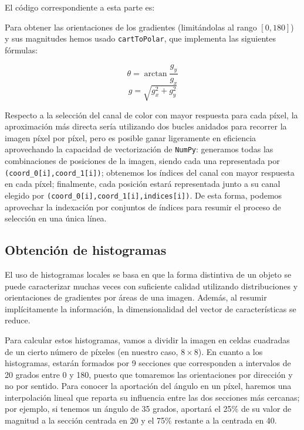 \documentclass[11pt,a4paper]{article}
\begin{document}
            \par
            El código correspondiente a esta parte es:


            \par
            Para obtener las orientaciones de los gradientes (limitándolas al rango $[0,180]$) y sus magnitudes hemos usado \texttt{cartToPolar}, que implementa las siguientes fórmulas:

            $$\theta = \arctan{\frac{g_y}{g_x}}$$
            $$g = \sqrt{g_{x}^2 + g_{y}^2}$$

            \par
            Respecto a la selección del canal de color con mayor respuesta para cada píxel, la aproximación más directa sería utilizando dos bucles anidados para recorrer la imagen píxel por píxel, pero es posible ganar ligeramente en eficiencia aprovechando la capacidad de vectorización de \texttt{NumPy}: generamos todas las combinaciones de posiciones de la imagen, siendo cada una representada por \texttt{(coord\_0[i],coord\_1[i])}; obtenemos los índices del canal con mayor respuesta en cada píxel; finalmente, cada posición estará representada junto a su canal elegido por \texttt{(coord\_0[i],coord\_1[i],indices[i])}. De esta forma, podemos aprovechar la indexación por conjuntos de índices para resumir el proceso de selección en una única línea.

        \subsection{Obtención de histogramas}

            \par
            El uso de histogramas locales se basa en que la forma distintiva de un objeto se puede caracterizar muchas veces con suficiente calidad utilizando distribuciones y orientaciones de gradientes por áreas de una imagen. Además, al resumir implícitamente la información, la dimensionalidad del vector de características se reduce.

            \par
            Para calcular estos histogramas, vamos a dividir la imagen en celdas cuadradas de un cierto número de píxeles (en nuestro caso, $8\times8$). En cuanto a los  histogramas, estarán formados por 9 secciones que corresponden a intervalos de 20 grados entre 0 y 180, puesto que tomaremos las orientaciones por dirección y no por sentido. Para conocer la aportación del ángulo en un píxel, haremos una interpolación lineal que reparta su influencia entre las dos secciones más cercanas; por ejemplo, si tenemos un ángulo de 35 grados, aportará el 25\% de su valor de magnitud a la sección centrada en 20 y el 75\% restante a la centrada en 40.
\end{document}
